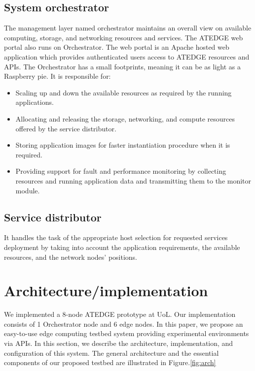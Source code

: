 \documentclass[conference]{IEEEtran}
\begin{document}
\subsection{System orchestrator}
\par The management layer named orchestrator maintains an overall view on available computing, storage, and networking resources and services. The ATEDGE web portal also runs on Orchestrator. The web portal is an  Apache hosted web application which provides authenticated users access to ATEDGE resources and APIs. The Orchestrator has a small footprints, meaning it can be as light as a Raspberry pie. It is responsible for:
\begin{itemize}
\item Scaling up and down the available resources as required by the running applications. 
\item Allocating and releasing the storage, networking, and compute resources offered by the service distributor.
\item Storing application images for faster instantiation procedure when it is required.
\item Providing support for fault and performance monitoring by collecting resources and running application
data and transmitting them to the monitor module.
\end{itemize}

\subsection{Service distributor}
\par It handles the task of the appropriate host selection for requested services deployment by taking into account the application requirements, the available resources, and the network nodes' positions.




\section{Architecture/implementation}
\par We implemented a 8-node ATEDGE prototype at UoL. Our implementation consists of 1 Orchestrator node and 6 edge nodes. In this paper, we propose an easy-to-use edge computing testbed system providing experimental environments
via APIs. In this section, we describe the architecture, implementation, and configuration of this system.
The general architecture and the essential components of our proposed testbed are illustrated in Figure.\ref{fig:arch} 
\end{document}
